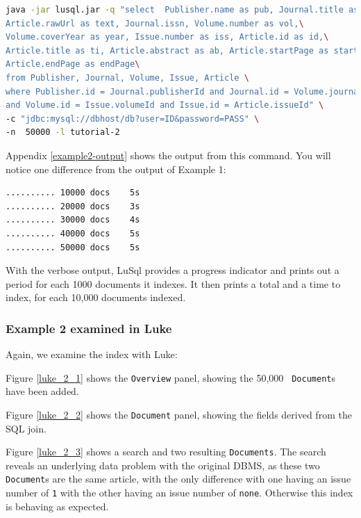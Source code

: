 {\small
\begin{lstlisting}[backgroundcolor=\color{grey},language=Bash]
java -jar lusql.jar -q "select  Publisher.name as pub, Journal.title as jo,\
Article.rawUrl as text, Journal.issn, Volume.number as vol,\
Volume.coverYear as year, Issue.number as iss, Article.id as id,\
Article.title as ti, Article.abstract as ab, Article.startPage as startPage,\
Article.endPage as endPage\
from Publisher, Journal, Volume, Issue, Article \
where Publisher.id = Journal.publisherId and Journal.id = Volume.journalId \
and Volume.id = Issue.volumeId and Issue.id = Article.issueId" \
-c "jdbc:mysql://dbhost/db?user=ID&password=PASS" \
-n  50000 -l tutorial-2
\end{lstlisting}
}
Appendix \ref{example2-output} shows the output from this command.
You will notice one difference from the output of Example 1: 
{\small
\begin{lstlisting}[backgroundcolor=\color{grey},language=Bash]
.......... 10000 docs    5s                                                                                   
.......... 20000 docs    3s                                                                                   
.......... 30000 docs    4s                                                                                   
.......... 40000 docs    5s                                                                                   
.......... 50000 docs    5s                                                                                   
\end{lstlisting}
}
With the verbose output, LuSql provides a progress indicator and prints out a
period for each 1000 documents it indexes.
It then prints a total and a time to index, for each 10,000 documents indexed.


\subsubsection{Example 2 examined in Luke}
Again, we examine the index with Luke:
\begin{mlist}
\item Figure \ref{luke_2_1} shows the {\tt Overview} panel, showing the 50,000 {\tt
    Document}s have been added.
\item Figure \ref{luke_2_2} shows the {\tt Document} panel, showing the fields
  derived from the SQL join.
\item Figure \ref{luke_2_3} shows a search and two resulting {\tt Documents}. 
  The search reveals an underlying data problem with the original DBMS, as
  these two {\tt Document}s are the same article, with the only difference
  with one having an issue number of {\tt 1} with the other having an issue
  number of {\tt none}.
  Otherwise this index is behaving as expected.
\end{mlist}

